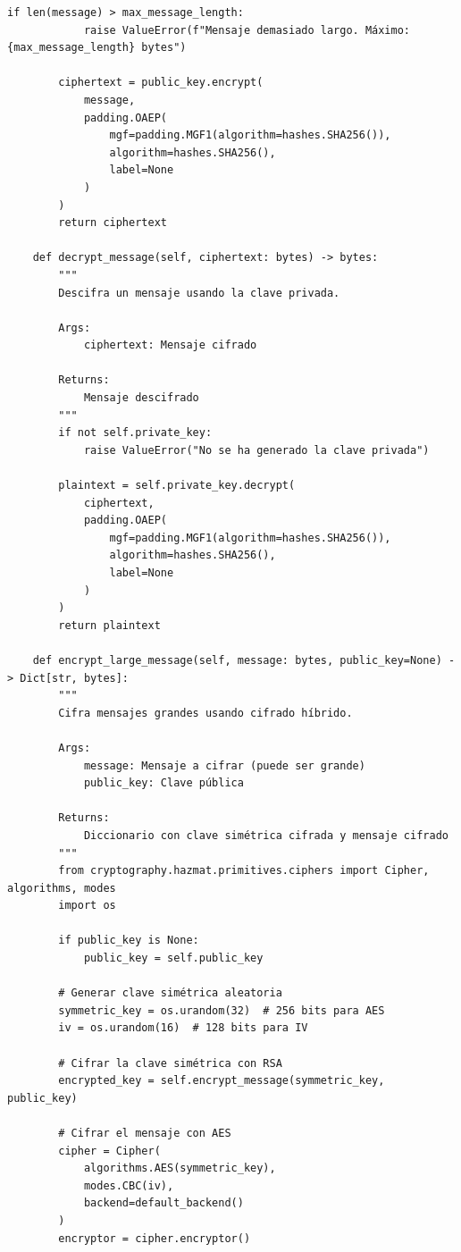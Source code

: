 \documentclass[12pt,a4paper]{article}
\begin{document}
\begin{lstlisting}[caption=Implementación de cifrado asimétrico con RSA]
        if len(message) > max_message_length:
            raise ValueError(f"Mensaje demasiado largo. Máximo: {max_message_length} bytes")
            
        ciphertext = public_key.encrypt(
            message,
            padding.OAEP(
                mgf=padding.MGF1(algorithm=hashes.SHA256()),
                algorithm=hashes.SHA256(),
                label=None
            )
        )
        return ciphertext
    
    def decrypt_message(self, ciphertext: bytes) -> bytes:
        """
        Descifra un mensaje usando la clave privada.
        
        Args:
            ciphertext: Mensaje cifrado
            
        Returns:
            Mensaje descifrado
        """
        if not self.private_key:
            raise ValueError("No se ha generado la clave privada")
            
        plaintext = self.private_key.decrypt(
            ciphertext,
            padding.OAEP(
                mgf=padding.MGF1(algorithm=hashes.SHA256()),
                algorithm=hashes.SHA256(),
                label=None
            )
        )
        return plaintext
    
    def encrypt_large_message(self, message: bytes, public_key=None) -> Dict[str, bytes]:
        """
        Cifra mensajes grandes usando cifrado híbrido.
        
        Args:
            message: Mensaje a cifrar (puede ser grande)
            public_key: Clave pública
            
        Returns:
            Diccionario con clave simétrica cifrada y mensaje cifrado
        """
        from cryptography.hazmat.primitives.ciphers import Cipher, algorithms, modes
        import os
        
        if public_key is None:
            public_key = self.public_key
            
        # Generar clave simétrica aleatoria
        symmetric_key = os.urandom(32)  # 256 bits para AES
        iv = os.urandom(16)  # 128 bits para IV
        
        # Cifrar la clave simétrica con RSA
        encrypted_key = self.encrypt_message(symmetric_key, public_key)
        
        # Cifrar el mensaje con AES
        cipher = Cipher(
            algorithms.AES(symmetric_key),
            modes.CBC(iv),
            backend=default_backend()
        )
        encryptor = cipher.encryptor()
        

\end{lstlisting}
\end{document}
